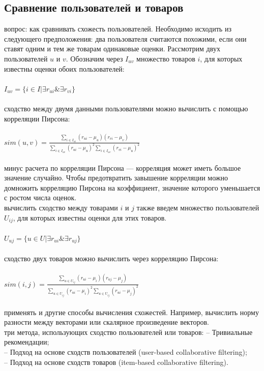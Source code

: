 \documentclass{article}
\newcommand\tab[1][1cm]{\hspace*{#1}}
\begin{document}
\subsection{Сравнение пользователей и товаров}
 вопрос: как сравнивать схожесть пользователей. Необходимо исходить из следующего предположения: два пользователя считаются похожими, если они ставят одним и тем же товарам одинаковые оценки. Рассмотрим двух пользователей ﻿$u$﻿ и ﻿$v$﻿. Обозначим через ﻿$I_{uv}$ множество товаров ﻿$i$, для которых известны оценки обоих пользователей:\\
\\
\tab$I_{uv}=\{ i\in I | \exists r_{ui} \& \exists r_{vi}\}$\\
\\
 сходство между двумя данными пользователями можно вычислить с помощью корреляции Пирсона:\\
\\
\tab$sim(u,v)=\frac{\sum_{i\in I_{ui}}{(r_{ui}-\mu_u)(r_{vi}-\mu_v)}}{\sum_{i\in I_{uv}}{(r_{ui}-\mu_u)^2}\sum_{i\in I_{uv}}{(r_{vi}-\mu_u)^2}}$\\
\\
 минус расчета по корреляции Пирсона —  корреляция может иметь большое значение случайно. Чтобы предотвратить завышение корреляции можно домножить корреляцию Пирсона на коэффициент, значение которого уменьшается с ростом числа оценок.\\
 вычислить сходство между товарами $i$﻿ и ﻿$j$﻿ также введем множество пользователей ﻿$U_{ij}$﻿, для которых известны оценки для этих товаров.\\
\\
\tab$U_{uj}=\{u\in U|\exists r_{ui} \&\exists r_{uj}\}$\\
\\
 сходство двух товаров можно вычислить через корреляцию Пирсона:\\
\\
\tab$sim(i,j)=\frac{\sum_{u\in U_{ij}}{(r_{ui}-\mu_i)(r_{uj}-\mu_j)}}{\sum_{u\in U_{ij}}{(r_{ui}-\mu_i)^2}\sum_{u\in U_{ij}}{(r_{ui}-\mu_j)^2}}$\\
\\
 применять и другие способы вычисления схожестей. Например, вычислить норму разности между векторами или скалярное произведение векторов.\\
 три метода, использующих сходство пользователей или товаров:
\tab– Тривиальные рекомендации;\\
\tab– Подход на основе сходств пользователей (user-based collaborative filtering);\\
\tab– Подход на основе сходств товаров (item-based collaborative filtering).
\end{document}
